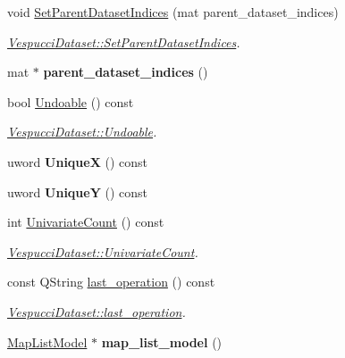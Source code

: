 \begin{DoxyCompactItemize}
void \hyperlink{class_vespucci_dataset_a94d860fa93e9ad389f927e58e22ee6d9}{Set\+Parent\+Dataset\+Indices} (mat parent\+\_\+dataset\+\_\+indices)
\begin{DoxyCompactList}\small\item\em \hyperlink{class_vespucci_dataset_a94d860fa93e9ad389f927e58e22ee6d9}{Vespucci\+Dataset\+::\+Set\+Parent\+Dataset\+Indices}. \end{DoxyCompactList}\item 
mat $\ast$ {\bfseries parent\+\_\+dataset\+\_\+indices} ()\hypertarget{class_vespucci_dataset_acb7c814ab4c02c46b9bb22c73a48e3ed}{}\label{class_vespucci_dataset_acb7c814ab4c02c46b9bb22c73a48e3ed}

\item 
bool \hyperlink{class_vespucci_dataset_aadd48ad4f6ea1b4d45467ae56d13cd6c}{Undoable} () const 
\begin{DoxyCompactList}\small\item\em \hyperlink{class_vespucci_dataset_aadd48ad4f6ea1b4d45467ae56d13cd6c}{Vespucci\+Dataset\+::\+Undoable}. \end{DoxyCompactList}\item 
uword {\bfseries UniqueX} () const \hypertarget{class_vespucci_dataset_a4caaa326bfdef1870b0a9e344ee9bba6}{}\label{class_vespucci_dataset_a4caaa326bfdef1870b0a9e344ee9bba6}

\item 
uword {\bfseries UniqueY} () const \hypertarget{class_vespucci_dataset_a90492e9d6a62b5b2d3c9b3b114ef1159}{}\label{class_vespucci_dataset_a90492e9d6a62b5b2d3c9b3b114ef1159}

\item 
int \hyperlink{class_vespucci_dataset_ad3f36833023633c1270c849fcd87a239}{Univariate\+Count} () const 
\begin{DoxyCompactList}\small\item\em \hyperlink{class_vespucci_dataset_ad3f36833023633c1270c849fcd87a239}{Vespucci\+Dataset\+::\+Univariate\+Count}. \end{DoxyCompactList}\item 
const Q\+String \hyperlink{class_vespucci_dataset_a5b03ff0880af7d3062644fc2d71ae760}{last\+\_\+operation} () const 
\begin{DoxyCompactList}\small\item\em \hyperlink{class_vespucci_dataset_a5b03ff0880af7d3062644fc2d71ae760}{Vespucci\+Dataset\+::last\+\_\+operation}. \end{DoxyCompactList}\item 
\hyperlink{class_map_list_model}{Map\+List\+Model} $\ast$ {\bfseries map\+\_\+list\+\_\+model} ()\hypertarget{class_vespucci_dataset_ab3f76db92077ce0744067f1450ea0b7c}{}\label{class_vespucci_dataset_ab3f76db92077ce0744067f1450ea0b7c}


\end{DoxyCompactItemize}
